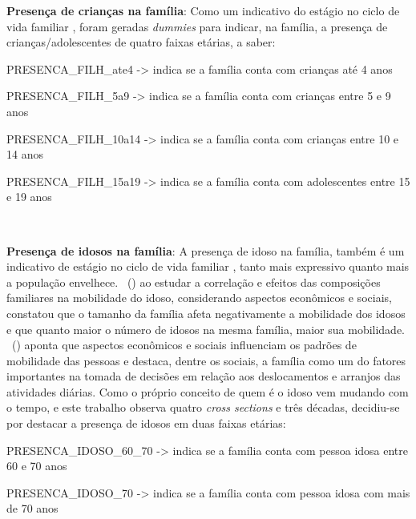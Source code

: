 \begin{compactitem}
\item \textbf{Presença de crianças na família}: Como um indicativo do estágio no ciclo de vida familiar \cite{ORTUZAR1994}, foram geradas \textit{dummies} para indicar, na família, a presença de crianças/adolescentes de quatro faixas etárias, a saber: 

    \begin{compactitem}[]
    \item PRESENCA_FILH_ate4 -> indica se a família conta com crianças até 4 anos
    \item PRESENCA_FILH_5a9 -> indica se a família conta com crianças entre 5 e 9 anos
    \item PRESENCA_FILH_10a14 -> indica se a família conta com crianças entre 10 e 14 anos
    \item PRESENCA_FILH_15a19 -> indica se a família conta com adolescentes entre 15 e 19 anos
    \end{compactitem}\

\item \textbf{Presença de idosos na família}: A presença de idoso na família, também é um indicativo de estágio no ciclo de vida familiar \cite{ORTUZAR1994}, tanto mais expressivo quanto mais a população envelhece. 
\ (\citeyear{OLIVEIRA2014}) ao estudar a correlação e efeitos das composições familiares na
mobilidade do idoso, considerando aspectos econômicos e sociais, constatou que o tamanho da família afeta negativamente a mobilidade dos idosos e que quanto maior o número de idosos na mesma família, maior sua mobilidade. 
\ (\citeyear{VASCONCELLOS2001}) aponta que aspectos econômicos e sociais influenciam os padrões de mobilidade das pessoas e destaca, dentre os sociais, a família como um do fatores importantes na tomada de decisões em relação aos deslocamentos e arranjos das atividades diárias. Como o próprio conceito de quem é o idoso vem mudando com o tempo, e este trabalho observa quatro \textit{cross sections} e três décadas, decidiu-se por destacar a presença de idosos em duas faixas etárias:

    \begin{compactitem}[]
    \item PRESENCA_IDOSO_60_70 -> indica se a família conta com pessoa idosa entre 60 e 70 anos
    \item PRESENCA_IDOSO_70 -> indica se a família conta com pessoa idosa com mais de 70 anos
    \end{compactitem}

\end{compactitem}